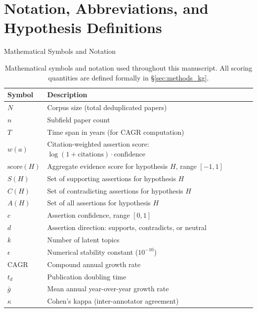 \documentclass[
  ignorenonframetext,
]{beamer}
\author{\texorpdfstring{}{}}
\date{}
\begin{document}
\section{Notation, Abbreviations, and Hypothesis
Definitions}\label{notation-abbreviations-and-hypothesis-definitions}

\begin{frame}{Mathematical Symbols and Notation}
\protect{}\label{mathematical-symbols-and-notation}
\begin{table}[htbp]
\centering
\caption{Mathematical symbols and notation used throughout this manuscript. All scoring quantities are defined formally in \S\ref{sec:methods_kg}.}
\label{tab:notation_symbols}
\begin{tabular}{ll}
\toprule
\textbf{Symbol} & \textbf{Description} \\
\midrule
$N$ & Corpus size (total deduplicated papers) \\
$n$ & Subfield paper count \\
$T$ & Time span in years (for CAGR computation) \\
$w(a)$ & Citation-weighted assertion score: $\log(1 + \text{citations}) \cdot \text{confidence}$ \\
$\text{score}(H)$ & Aggregate evidence score for hypothesis $H$, range $[-1, 1]$ \\
$S(H)$ & Set of supporting assertions for hypothesis $H$ \\
$C(H)$ & Set of contradicting assertions for hypothesis $H$ \\
$A(H)$ & Set of all assertions for hypothesis $H$ \\
$c$ & Assertion confidence, range $[0, 1]$ \\
$d$ & Assertion direction: supports, contradicts, or neutral \\
$k$ & Number of latent topics \\
$\epsilon$ & Numerical stability constant ($10^{-10}$) \\
$\text{CAGR}$ & Compound annual growth rate \\
$t_d$ & Publication doubling time \\
$\bar{g}$ & Mean annual year-over-year growth rate \\
$\kappa$ & Cohen's kappa (inter-annotator agreement) \\
\bottomrule
\end{tabular}
\end{table}
\end{frame}
\end{document}
